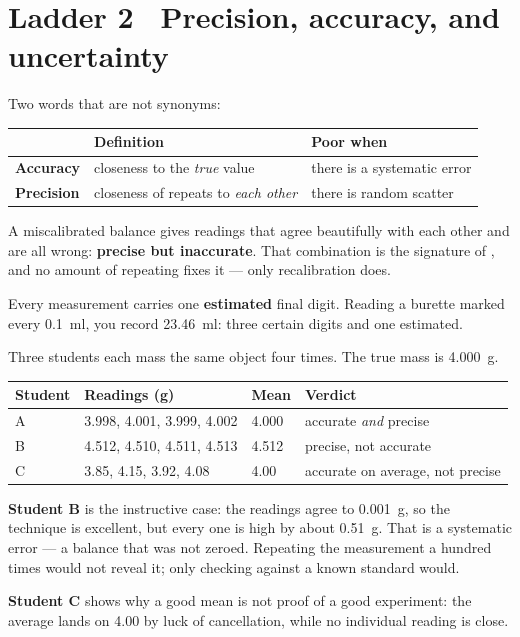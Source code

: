 \documentclass{apchem-worksheet}
\begin{document}
\section*{\sffamily Ladder 2 \textbullet\ Precision, accuracy, and
uncertainty}

Two words that are not synonyms:

\begin{center}
\renewcommand{\arraystretch}{1.2}
\begin{tabular}{@{}lll@{}}
\hline
 & \textbf{Definition} & \textbf{Poor when} \\
\hline
\textbf{Accuracy} & closeness to the \emph{true} value &
  there is a systematic error \\
\textbf{Precision} & closeness of repeats to \emph{each other} &
  there is random scatter \\
\hline
\end{tabular}
\end{center}

A miscalibrated balance gives readings that agree beautifully with each
other and are all wrong: \textbf{precise but inaccurate}. That
combination is the signature of , and no amount of
repeating fixes it --- only recalibration does.

Every measurement carries one \textbf{estimated} final digit. Reading a
burette marked every \SI{0.1}{\milli\litre}, you record
\SI{23.46}{\milli\litre}: three certain digits and one estimated.

\begin{workedexample}
Three students each mass the same object four times. The true mass is
\SI{4.000}{\gram}.
\begin{center}
\renewcommand{\arraystretch}{1.15}
\begin{tabular}{@{}llll@{}}
\hline
\textbf{Student} & \textbf{Readings (g)} & \textbf{Mean} &
  \textbf{Verdict} \\
\hline
A & 3.998, 4.001, 3.999, 4.002 & 4.000 & accurate \emph{and} precise \\
B & 4.512, 4.510, 4.511, 4.513 & 4.512 & precise, not accurate \\
C & 3.85, 4.15, 3.92, 4.08 & 4.00 & accurate on average, not precise \\
\hline
\end{tabular}
\end{center}

\textbf{Student B} is the instructive case: the readings agree to
\SI{0.001}{\gram}, so the technique is excellent, but every one is high
by about \SI{0.51}{\gram}. That is a systematic error --- a balance that
was not zeroed. Repeating the measurement a hundred times would not
reveal it; only checking against a known standard would.

\textbf{Student C} shows why a good mean is not proof of a good
experiment: the average lands on 4.00 by luck of cancellation, while no
individual reading is close.
\end{workedexample}
\end{document}

